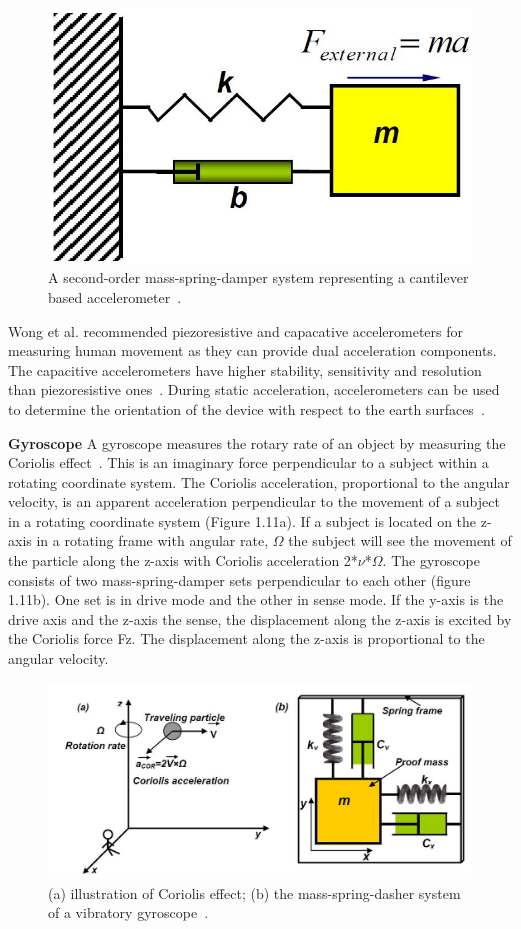 \documentclass[whitelogo]{tudelft-report}
\begin{document}
{\begin{figure}[!ht]
	\includegraphics[width=.5\linewidth]{accelerometer.JPG}
	\caption{A second-order mass-spring-damper system representing a cantilever based accelerometer~\cite{zeng2011sensing}.}
	\label{fig:my_label}
\end{figure}

	
Wong et al. \cite{wong2007clinical} recommended piezoresistive and capacative accelerometers for measuring human movement as they can provide dual acceleration components. The capacitive accelerometers have higher stability, sensitivity and resolution than piezoresistive ones~\cite{Gardner1994Microsensors}. During static acceleration, accelerometers can be used to determine the orientation of the device with respect to the earth surfaces~\cite{wong2007clinical}. 
\newline
	
	
\textbf{Gyroscope}\newline
A gyroscope measures the rotary rate of an object by measuring the Coriolis effect~\cite{zeng2011sensing}. This is an imaginary force perpendicular to a subject within a rotating coordinate system. The Coriolis acceleration, proportional to the angular velocity, is an apparent acceleration perpendicular to the movement of a subject in a rotating coordinate system (Figure 1.11a). If a subject is located on the z-axis in a rotating frame with angular rate, \( \Omega\)
the subject will see the movement of the particle along the z-axis with Coriolis acceleration 2*\( \nu\)*\( \Omega\). 
The gyroscope consists of two mass-spring-damper sets perpendicular to each other (figure 1.11b). One set is in drive mode and the other in sense mode. If the y-axis is the drive axis and the z-axis the sense, the displacement along the z-axis is excited by the Coriolis force Fz. The displacement along the z-axis is proportional to the angular velocity. %
\begin{figure}[!htb]
	\includegraphics[width=1\linewidth]{gyroscope.JPG}
	\caption{(a) illustration of Coriolis effect;
			(b) the mass-spring-dasher system of a vibratory gyroscope~\cite{zeng2011sensing}.}
	\label{fig:my_label}
\end{figure}

}
\end{document}
